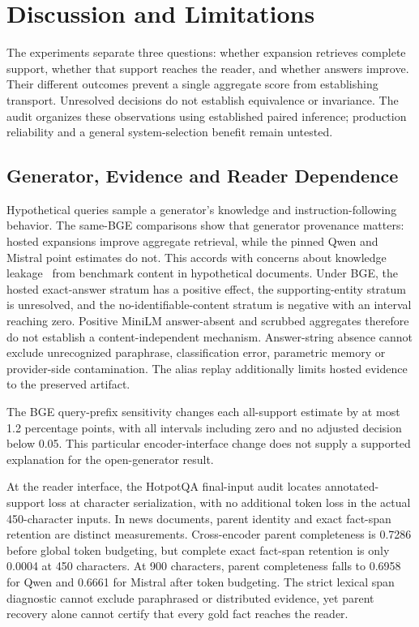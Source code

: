 \section{Discussion and Limitations}
\label{sec:discussion_limitations}

The experiments separate three questions: whether expansion retrieves complete support, whether that support reaches the reader, and whether answers improve. Their different outcomes prevent a single aggregate score from establishing transport. Unresolved decisions do not establish equivalence or invariance. The audit organizes these observations using established paired inference; production reliability and a general system-selection benefit remain untested.

\subsection{Generator, Evidence and Reader Dependence}
\label{sec:generator_reader_dependence}

Hypothetical queries sample a generator's knowledge and instruction-following behavior. The same-BGE comparisons show that generator provenance matters: hosted expansions improve aggregate retrieval, while the pinned Qwen and Mistral point estimates do not. This accords with concerns about knowledge leakage~\cite{yoon2025knowledgeleakage} from benchmark content in hypothetical documents. Under BGE, the hosted exact-answer stratum has a positive effect, the supporting-entity stratum is unresolved, and the no-identifiable-content stratum is negative with an interval reaching zero. Positive MiniLM answer-absent and scrubbed aggregates therefore do not establish a content-independent mechanism. Answer-string absence cannot exclude unrecognized paraphrase, classification error, parametric memory or provider-side contamination. The alias replay additionally limits hosted evidence to the preserved artifact.

The BGE query-prefix sensitivity changes each all-support estimate by at most 1.2 percentage points, with all intervals including zero and no adjusted decision below 0.05. This particular encoder-interface change does not supply a supported explanation for the open-generator result.

At the reader interface, the HotpotQA final-input audit locates annotated-support loss at character serialization, with no additional token loss in the actual 450-character inputs. In news documents, parent identity and exact fact-span retention are distinct measurements. Cross-encoder parent completeness is 0.7286 before global token budgeting, but complete exact fact-span retention is only 0.0004 at 450 characters. At 900 characters, parent completeness falls to 0.6958 for Qwen and 0.6661 for Mistral after token budgeting. The strict lexical span diagnostic cannot exclude paraphrased or distributed evidence, yet parent recovery alone cannot certify that every gold fact reaches the reader.

